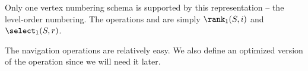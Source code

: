 \begin{algorithm}
\begin{algorithmic}
	\State {}
\EndFunction
\end{algorithmic}
\end{algorithm}

Only one vertex numbering schema is supported by this representation -- the level-order numbering.
The operations \loRank{} and \loSelect{} are simply $\rank_1(S, i)$ and $\select_1(S, r)$.


The navigation operations are relatively easy.
We also define an optimized version of the operation \childLast{} since we will need it later.

\begin{algorithm}
\begin{algorithmic}
	\State {}
\EndFunction
\end{algorithmic}
\end{algorithm}

\begin{algorithm}
\begin{algorithmic}
	\State {} 
\EndFunction
\end{algorithmic}
\end{algorithm}

\begin{algorithm}
\begin{algorithmic}
	\State {} 
\EndFunction
\end{algorithmic}
\end{algorithm}

\begin{algorithm}
\begin{algorithmic}
	\State {} 
\EndFunction
\end{algorithmic}
\end{algorithm}

\begin{algorithm}
\begin{algorithmic}
	\State {} 
\EndFunction
\end{algorithmic}
\end{algorithm}

